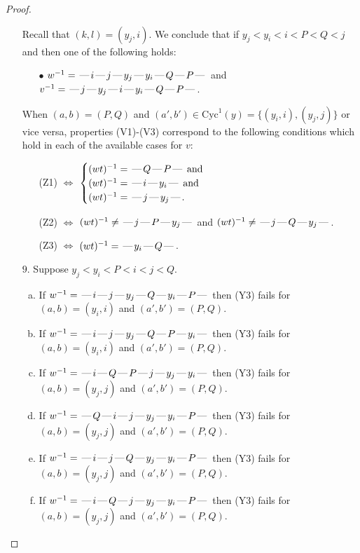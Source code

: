 \documentclass[10pt]{article}
\theoremstyle{definition}
\theoremstyle{definition}
\def\dash{\text{\hspace{0.5mm}---\hspace{0.5mm}}}
\def\Cyc{\mathrm{Cyc}}
\begin{document}
\begin{proof}
\begin{enumerate}
\begin{enumerate}[(a)]
\end{enumerate}
Recall that $(k,l) = (y_j,i)$.
We conclude that if $y_j < y_i < i < P < Q < j$ and then one of the following holds:
\begin{enumerate}
\item[$\bullet$] $w^{-1} = \dash i\dash j\dash y_j\dash y_i\dash Q\dash P\dash $ and $v^{-1} = \dash j\dash y_j\dash i\dash y_i\dash Q\dash P\dash $.
\end{enumerate}
When $(a,b)= (P,Q)$ and $(a',b')\in \Cyc^1(y)=\{(y_i,i),(y_j,j)\}$ or vice versa,
properties (V1)-(V3) correspond to the following conditions which hold in
each of the available cases for $v$:
\begin{enumerate}
\item[](Z1) $\Leftrightarrow$ $\begin{cases}\text{$(wt)^{-1} = \dash Q \dash P \dash$}\text{ and }\\
\text{$(wt)^{-1} = \dash i \dash y_i \dash$}\text{ and }\\
\text{$(wt)^{-1} = \dash j \dash y_j \dash$}.\end{cases}$
\item[](Z2) $\Leftrightarrow$ $(wt)^{-1} \neq \dash j \dash P \dash y_j \dash$ and $(wt)^{-1}\neq \dash j \dash Q \dash y_j \dash$.
\item[](Z3) $\Leftrightarrow$ $(wt)^{-1} = \dash y_i \dash Q \dash$.
\end{enumerate}
\item[$9$.] Suppose $y_j < y_i < P < i < j < Q$.
\begin{enumerate}[(a)]
\item If $w^{-1} = \dash i\dash j\dash y_j\dash Q\dash y_i\dash P\dash $ then (Y3) fails for $(a,b)=(y_i,i)$ and $(a',b')=(P,Q)$.
\item If $w^{-1} = \dash i\dash j\dash y_j\dash Q\dash P\dash y_i\dash $ then (Y3) fails for $(a,b)=(y_i,i)$ and $(a',b')=(P,Q)$.
\item If $w^{-1} = \dash i\dash Q\dash P\dash j\dash y_j\dash y_i\dash $ then (Y3) fails for $(a,b)=(y_j,j)$ and $(a',b')=(P,Q)$.
\item If $w^{-1} = \dash Q\dash i\dash j\dash y_j\dash y_i\dash P\dash $ then (Y3) fails for $(a,b)=(y_j,j)$ and $(a',b')=(P,Q)$.
\item If $w^{-1} = \dash i\dash j\dash Q\dash y_j\dash y_i\dash P\dash $ then (Y3) fails for $(a,b)=(y_j,j)$ and $(a',b')=(P,Q)$.
\item If $w^{-1} = \dash i\dash Q\dash j\dash y_j\dash y_i\dash P\dash $ then (Y3) fails for $(a,b)=(y_j,j)$ and $(a',b')=(P,Q)$.

\end{enumerate}
\end{enumerate}
\end{proof}
\end{document}
